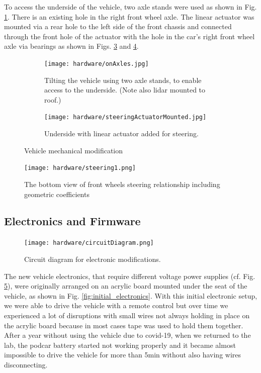 \documentclass[a4paper]{article}
\begin{document}
To access the underside of the vehicle, two axle stands were used as shown in Fig. \ref{fig:axelStands}. There is an existing hole in the right front wheel axle. The linear actuator was mounted via a rear hole to the left side of the front chassis and connected through the front hole of the actuator with the hole in the car's right front wheel axle via bearings as shown in Figs. \ref{fig:actuatorMounted} and \ref{fig:steering}.


\begin{figure}
	\centering
	\begin{subfigure}{0.45\textwidth}
		\centering
		\texttt{[image: hardware/onAxles.jpg]}
		\caption{Tilting the vehicle using two axle stands, to enable access to the underside. (Note also lidar mounted to roof.)}
		\label{fig:axelStands}
	\end{subfigure}	
	\quad
	\begin{subfigure}{0.45\textwidth}
		\centering
		\texttt{[image: hardware/steeringActuatorMounted.jpg]}
		\caption{Underside with linear actuator added for steering.}
		\label{fig:actuatorMounted}
	\end{subfigure}
	\caption{Vehicle mechanical modification}
\end{figure}


\begin{figure}[h]
	\texttt{[image: hardware/steering1.png]}
	\caption{The bottom view of front wheels steering relationship including geometric coefficients}
	\label{fig:steering}
\end{figure}


\subsection{Electronics and Firmware}

\begin{figure}[h]
	\texttt{[image: hardware/circuitDiagram.png]}
	\caption{Circuit diagram for electronic modifications.}
	\label{fig:circuitDiagram}
\end{figure}


The new vehicle electronics, that require different voltage power supplies (cf. Fig. \ref{fig:circuitDiagram}), were originally arranged on an acrylic board mounted under the seat of the vehicle, as shown in Fig. \ref{fig:initial_electronics}. With this initial electronic setup, we were able to drive the vehicle with a remote control but over time we experienced a lot of disruptions with small wires not always holding in place on the acrylic board because in most cases tape was used to hold them together. After a year without using the vehicle due to covid-19, when we returned to the lab, the podcar battery started not working properly and it became almost impossible to drive the vehicle for more than 5min without also having wires disconnecting.
\end{document}

